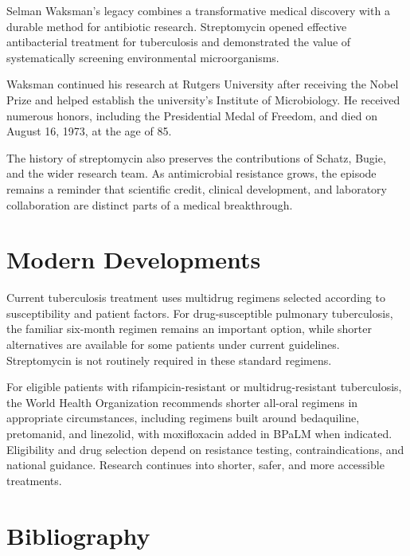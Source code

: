 Selman Waksman's legacy combines a transformative medical discovery with a durable method for antibiotic research. Streptomycin opened effective antibacterial treatment for tuberculosis and demonstrated the value of systematically screening environmental microorganisms.

Waksman continued his research at Rutgers University after receiving the Nobel Prize and helped establish the university's Institute of Microbiology. He received numerous honors, including the Presidential Medal of Freedom, and died on August 16, 1973, at the age of 85.

The history of streptomycin also preserves the contributions of Schatz, Bugie, and the wider research team. As antimicrobial resistance grows, the episode remains a reminder that scientific credit, clinical development, and laboratory collaboration are distinct parts of a medical breakthrough.

\section{Modern Developments}

Current tuberculosis treatment uses multidrug regimens selected according to susceptibility and patient factors. For drug-susceptible pulmonary tuberculosis, the familiar six-month regimen remains an important option, while shorter alternatives are available for some patients under current guidelines. Streptomycin is not routinely required in these standard regimens.

For eligible patients with rifampicin-resistant or multidrug-resistant tuberculosis, the World Health Organization recommends shorter all-oral regimens in appropriate circumstances, including regimens built around bedaquiline, pretomanid, and linezolid, with moxifloxacin added in BPaLM when indicated. Eligibility and drug selection depend on resistance testing, contraindications, and national guidance. Research continues into shorter, safer, and more accessible treatments.

\section{Bibliography}

